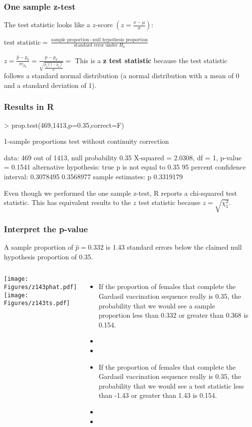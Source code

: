 \begin{frame}
\frametitle{One sample z-test}
The test statistic looks like a $z$-score $\displaystyle \left(z=\frac{x-\mu}{\sigma}\right)$:
\begin{center}
$\displaystyle \mbox{test statistic} = \frac{\mbox{sample proportion}-\mbox{null hypothesis proportion}}{\mbox{standard error under $H_0$}}$
\end{center}
\vskip10pt
$\displaystyle z = \frac{\hat{p}-p_0}{se_{p_0}}=\frac{\hat{p}-p_0}{\sqrt{\frac{p_0(1-p_0)}{n}}}=$%
\vskip10pt
This is a \textbf{z test statistic} because the test statistic follows a standard normal distribution (a normal distribution with a mean of 0 and a standard deviation of 1).
\end{frame}

\begin{frame}[fragile]
\frametitle{Results in R}
\begin{lcverbatim}
> prop.test(469,1413,p=0.35,correct=F)

	1-sample proportions test without continuity correction

data:  469 out of 1413, null probability 0.35
X-squared = 2.0308, df = 1, p-value = 0.1541
alternative hypothesis: true p is not equal to 0.35
95 percent confidence interval:
 0.3078495 0.3568977
sample estimates:
        p
0.3319179
\end{lcverbatim}
Even though we performed the one sample z-test, R reports a chi-squared test statistic.  This has equivalent results to the $z$ test statistic because $z=\sqrt{\chi^2_1}$.
\end{frame}


\begin{frame}
\frametitle{Interpret the p-value}
\small{A sample proportion of $\hat{p}=0.332$ is 1.43 standard errors below the claimed null hypothesis proportion of 0.35.}\\
\begin{columns}
\texttt{[image: Figures/z143phat.pdf]}\\
\texttt{[image: Figures/z143ts.pdf]}
\begin{itemize}
\item
If the proportion of females that complete the Gardasil vaccination sequence really is 0.35, the probability that we would see a sample proportion less than 0.332 or greater than 0.368 is 0.154.
\item[]
\item[]
\item
If the proportion of females that complete the Gardasil vaccination sequence really is 0.35, the probability that we would see a test statistic less than -1.43 or greater than 1.43 is 0.154.
\item[]
\item[]
\end{itemize}
\end{columns}
\end{frame}


